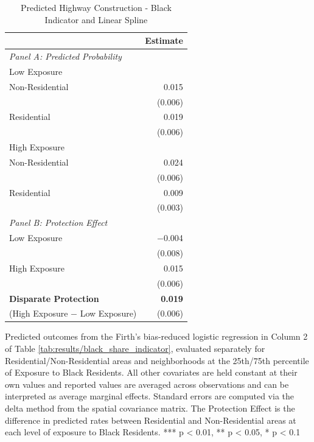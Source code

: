 \begin{table}[h]
\centering
\caption{Predicted Highway Construction - Black Indicator and Linear Spline}
\label{tab:predicted_outcomes/black_share_logitinteraction}
\begin{threeparttable}
\begin{tabular*}{1\textwidth}{@{\extracolsep{\fill}}lr@{\hspace{1.2em}}}
\toprule
 & Estimate \\
\midrule
\textit{Panel A: Predicted Probability} & \\
\addlinespace[2pt]
Low Exposure & \\
\quad Non-Residential & 0.015 \\
 & (0.006) \\[4pt]
\quad Residential & 0.019 \\
 & (0.006) \\[4pt]
High Exposure & \\
\quad Non-Residential & 0.024 \\
 & (0.006) \\[4pt]
\quad Residential & 0.009 \\
 & (0.003) \\[4pt]
\midrule
\textit{Panel B: Protection Effect} & \\
\addlinespace[2pt]
Low Exposure & $-$0.004 \\
 & (0.008) \\[4pt]
High Exposure & 0.015\rlap{$^{**}$} \\
 & (0.006) \\[4pt]
\addlinespace[2pt]
\textbf{Disparate Protection} & \textbf{0.019}\rlap{$^{***}$} \\
(High Exposure $-$ Low Exposure) & (0.006) \\
\bottomrule
\end{tabular*}
\begin{tablenotes}[flushleft]
\footnotesize
\item Predicted outcomes from the Firth's bias-reduced logistic regression in Column 2 of Table \ref{tab:results/black_share_indicator}, evaluated separately for Residential/Non-Residential areas and neighborhoods at the 25th/75th percentile of Exposure to Black Residents. All other covariates are held constant at their own values and reported values are averaged across observations and can be interpreted as average marginal effects. Standard errors are computed via the delta method from the spatial covariance matrix. The Protection Effect is the difference in predicted rates between Residential and Non-Residential areas at each level of exposure to Black Residents. *** p < 0.01, ** p < 0.05, * p < 0.1
\end{tablenotes}
\end{threeparttable}
\end{table}
